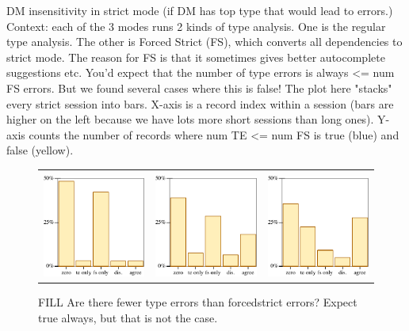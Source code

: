 \documentclass[english,submission,cleveref]{programming}
\begin{document}
DM insensitivity in strict mode
(if DM has top type that would lead to errors.)
Context: each of the 3 modes runs 2 kinds of type analysis. One is the regular
type analysis. The other is Forced Strict (FS), which converts all dependencies
to strict mode. The reason for FS is that it sometimes gives better
autocomplete suggestions etc.
You'd expect that the number of type errors is always <= num FS errors. But we
found several cases where this is false!
The plot here "stacks" every strict session into bars. X-axis is a record index
within a session (bars are higher on the left because we have lots more short
sessions than long ones). Y-axis counts the number of records where num TE <= num FS
is true (blue) and false (yellow).

\begin{figure}[t]\centering
  \begin{tabular}{lll}
    \mnocheck{} & \mnonstrict{} & \mstrict{} \\
    \includegraphics[width=0.3\columnwidth]{img/compass-nocheck.pdf}
    &
    \includegraphics[width=0.3\columnwidth]{img/compass-nonstrict.pdf}
    &
    \includegraphics[width=0.3\columnwidth]{img/compass-strict.pdf}
  \end{tabular}
  \caption{FILL Are there fewer type errors than forcedstrict errors? Expect true always, but that is not the case.}
  \label{f:tefs}
\end{figure}
\end{document}
